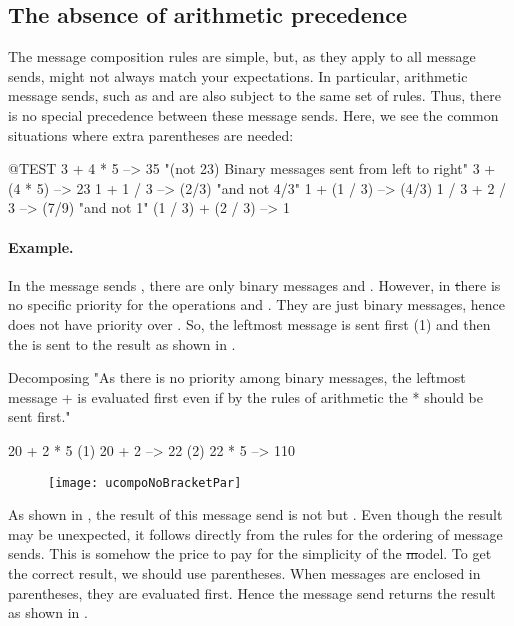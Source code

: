 \documentclass[a4paper,10pt,twoside]{book}
\begin{document}
\subsection{The absence of arithmetic precedence}
The message composition rules are simple, but, as they apply to all message sends, might not always match your expectations. 
In particular, arithmetic message sends, such as \ct{+} and \ct{*} are also subject to the same set of rules.
Thus, there is no special precedence between these message sends.
Here, we see the common situations where extra parentheses are needed:

\begin{code}{@TEST}
3 + 4 * 5      --> 35    "(not 23)  Binary messages sent from left to right"
3 + (4 * 5)    --> 23
1 + 1 / 3         --> (2/3)    "and not 4/3"
1 + (1 / 3)       --> (4/3)
1 / 3 + 2 / 3       --> (7/9)    "and not 1"
(1 / 3) + (2 / 3)  --> 1
\end{code}

\paragraph{Example.} 
In the message sends , there are only binary messages \ct{+} and \ct{*}.
However, in \st there is no specific priority for the operations \ct{+} and \ct{*}.
They are just binary messages, hence \ct{*} does not have priority over \ct{+}.
So, the leftmost message \ct{+} is sent first (1) and then the \ct{*} is sent to the result as shown in .  

\begin{example}[binaryMessages1]{Decomposing }{}
"As there is no priority among binary messages, the leftmost message + is evaluated first even if by the rules of arithmetic the * should be sent first."

      20 + 2 * 5 
(1)  20 + 2 --> 22
(2)  22       * 5 --> 110
\end{example}

\begin{figure}
\begin{center}\texttt{[image: ucompoNoBracketPar]}\end{center}
\end{figure}
\noindent
As shown in , the result of this message send is not  but .
Even though the result may be unexpected, it follows directly from the rules for the ordering of message sends.
This is somehow the price to pay for the simplicity of the \st model.
To get the correct result, we should use parentheses.
When messages are enclosed in parentheses, they are evaluated first.
Hence the message send  returns the result as shown in .
\end{document}
